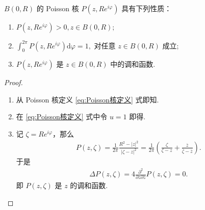 \documentclass[../../main.tex]{subfiles}%
\begin{document}
\begin{proposition}\label{proposition:poisson_kernel}
\(B(0,R)\) 的 Poisson 核 \(P(z,Re^{i\varphi})\) 具有下列性质：
\begin{enumerate}[(1)]
\item\label{proposition:poisson_kernel-1} \(P(z, Re^{i\varphi}) > 0, z \in B(0, R);\)
\item\label{proposition:poisson_kernel-2} \(\int_{0}^{2\pi} P(z, Re^{i\varphi}) \mathrm{d}\varphi = 1,\) 对任意 \(z \in B(0, R)\) 成立;
\item\label{proposition:poisson_kernel-3} \(P(z, Re^{i\varphi})\) 是 \(z \in B(0, R)\) 中的调和函数.
\end{enumerate}
\end{proposition}
\begin{proof}
\begin{enumerate}[(1)]
\item 从 Poisson 核定义 \eqref{eq:Poisson核定义} 式即知.
\item 在 \eqref{eq:Poisson核定义} 式中令 \(u=1\) 即得.
\item 记 \(\zeta = Re^{i\varphi}\)，那么
\begin{align}
P(z,\zeta) = \frac{1}{2\pi} \frac{R^2 - |z|^2}{|\zeta - z|^2} = \frac{1}{2\pi} \left( \frac{\zeta}{\zeta-z} + \frac{\overline{z}}{\overline{\zeta} - \overline{z}} \right). \label{eq:poisson_real_part}
\end{align}
于是
\begin{align} \Delta P(z,\zeta) = 4 \frac{\partial^2}{\partial z\partial \overline{z}} P(z,\zeta) = 0. \label{eq:laplacian_pz} \end{align}
即 \(P(z,\zeta)\) 是 \(z\) 的调和函数.
\end{enumerate}
\end{proof}
\end{document}
